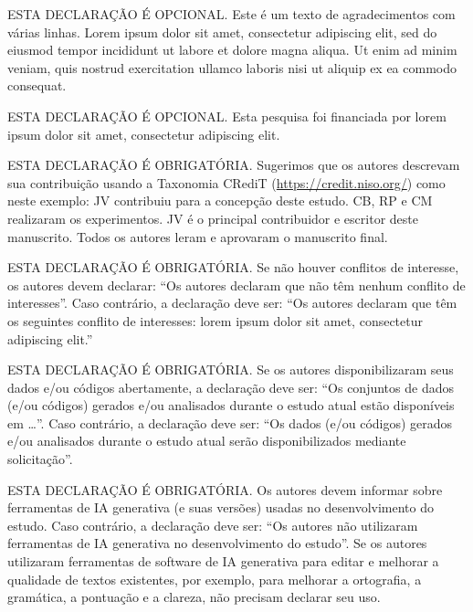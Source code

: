 \documentclass[portuguese]{sbc2025}%
\begin{document}
\begin{declarations}

\begin{acknowledgements}
ESTA DECLARAÇÃO É OPCIONAL. Este é um texto de agradecimentos com várias linhas. Lorem ipsum dolor sit amet, consectetur adipiscing elit, sed do eiusmod tempor incididunt ut labore et dolore magna aliqua. Ut enim ad minim veniam, quis nostrud exercitation ullamco laboris nisi ut aliquip ex ea commodo consequat.
\end{acknowledgements}

\begin{funding}
ESTA DECLARAÇÃO É OPCIONAL. Esta pesquisa foi financiada por lorem ipsum dolor sit amet, consectetur adipiscing elit.
\end{funding}

\begin{contributions}
ESTA DECLARAÇÃO É OBRIGATÓRIA. Sugerimos que os autores descrevam sua contribuição usando a Taxonomia CRediT (\href{https://credit.niso.org/}{https://credit.niso.org/}) como neste exemplo: JV contribuiu para a concepção deste estudo. CB, RP e CM realizaram os experimentos. JV é o principal contribuidor e escritor deste manuscrito. Todos os autores leram e aprovaram o manuscrito final. 
\end{contributions}

\begin{interests}
ESTA DECLARAÇÃO É OBRIGATÓRIA. Se não houver conflitos de interesse, os autores devem declarar: ``Os autores declaram que não têm nenhum conflito de interesses''. Caso contrário, a declaração deve ser: ``Os autores declaram que têm os seguintes conflito de interesses: lorem ipsum dolor sit amet, consectetur adipiscing elit.''
\end{interests}

\begin{materials}
ESTA DECLARAÇÃO É OBRIGATÓRIA. 
Se os autores disponibilizaram seus dados e/ou códigos abertamente, a declaração deve ser: 
``Os conjuntos de dados (e/ou códigos) gerados e/ou analisados durante o estudo atual estão disponíveis em \ldots''. 
Caso contrário, a declaração deve ser: 
``Os dados (e/ou códigos) gerados e/ou analisados durante o estudo atual serão disponibilizados mediante solicitação''. 
\end{materials}

\begin{aitools}
ESTA DECLARAÇÃO É OBRIGATÓRIA.  
Os autores devem informar sobre ferramentas de IA generativa (e suas versões) usadas no desenvolvimento do estudo. 
Caso contrário, a declaração deve ser: 
``Os autores não utilizaram ferramentas de IA generativa no desenvolvimento do estudo''.
%
Se os autores utilizaram ferramentas de software de IA generativa para editar e melhorar a qualidade de textos existentes, por exemplo, para melhorar a ortografia, a gramática, a pontuação e a clareza, não precisam declarar seu uso.
\end{aitools}

\end{declarations}



\end{document}
